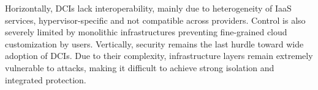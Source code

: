 \documentclass{sig-alternate}
\begin{document}
Horizontally, DCIs lack interoperability, mainly due to heterogeneity of IaaS services, hypervisor-specific and not compatible across providers. Control is also severely limited by monolithic infrastructures preventing fine-grained cloud customization by users. 
Vertically, security remains the last hurdle toward wide adoption of DCIs. Due to their complexity, infrastructure layers remain extremely vulnerable to attacks, making it difficult to achieve strong isolation and integrated protection.
\end{document}
